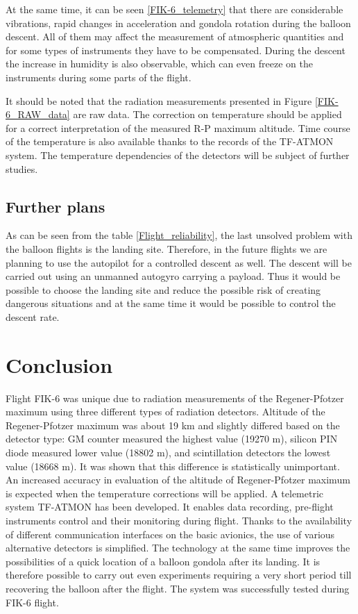 \documentclass{Rpd}
\begin{document}
At the same time, it can be seen \ref{FIK-6_telemetry} that there are considerable vibrations, rapid changes in acceleration and gondola rotation during the balloon descent. All of them may affect the measurement of atmospheric quantities and for some types of instruments they have to be compensated. During the descent the increase in humidity is also observable, which can even freeze on the instruments during some parts of the flight.

It should be noted that the radiation measurements presented in Figure \ref{FIK-6_RAW_data} are raw data. The correction on temperature should be applied for a correct interpretation of the measured R-P maximum altitude. Time course of the temperature is also available thanks to the records of the TF-ATMON system. The temperature dependencies of the detectors  will be subject of further studies.


\subsection{Further plans}

As can be seen from the table \ref{Flight_reliability}, the last unsolved problem with the balloon flights is the landing site. Therefore, in the future flights we are planning to use the autopilot for a controlled descent as well.
The descent will be carried out using an unmanned autogyro carrying a payload. Thus it would be possible to choose the landing site and reduce the possible risk of creating dangerous situations and at the same time it would be possible to control the descent rate. 

\section{Conclusion}

Flight FIK-6 was unique due to radiation measurements of the Regener-Pfotzer maximum using three different types of radiation detectors. Altitude of the Regener-Pfotzer maximum was about 19 km and slightly differed based on the detector type: GM counter measured the highest value (19270 m), silicon PIN diode measured lower value (18802 m), and scintillation detectors the lowest value (18668 m). It was shown that this difference is statistically unimportant. An increased accuracy in evaluation of the altitude of Regener-Pfotzer maximum is expected when the temperature corrections will be applied.
A telemetric system TF-ATMON has been developed. It enables data recording, pre-flight instruments control and their monitoring during flight. Thanks to the availability of different communication interfaces on the basic avionics, the use of various alternative detectors is simplified. The technology at the same time improves the possibilities of a quick location of a balloon gondola after its landing. It is therefore possible to carry out even experiments requiring a very short period till recovering the balloon after the flight. The system was successfully tested during FIK-6 flight.
\end{document}
